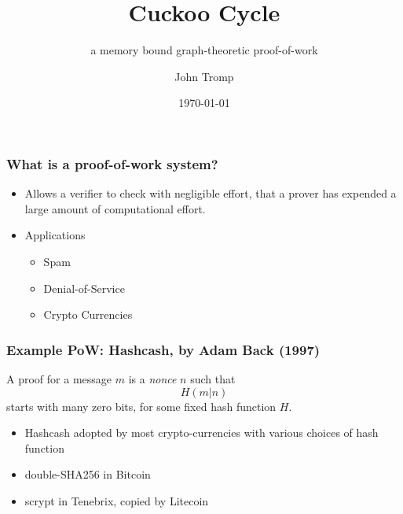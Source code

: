 \documentclass{beamer}
\title{Cuckoo Cycle}
\subtitle{a memory bound graph-theoretic proof-of-work}
\author{John Tromp}
\date{\today}
\begin{document}
\begin{frame}
  \titlepage
\end{frame}


\begin{frame}
\frametitle{What is a proof-of-work system?}
\begin{itemize}
\item
Allows a verifier to check with negligible effort, that a prover has expended a large amount of computational effort.
\item {Applications}
\begin{itemize}
\item Spam
\item Denial-of-Service
\item Crypto Currencies
\end{itemize}
\end{itemize}
\end{frame}

\begin{frame}
\frametitle{Example PoW: Hashcash, by Adam Back (1997)}
A \alert{proof} for a message $m$ is a {\em nonce} $n$ such that
\begin{equation*}
H(m|n)
\end{equation*} starts with many zero bits,
for some fixed hash function $H$.
\begin{itemize}
\item
Hashcash adopted by most crypto-currencies
with various choices of hash function
\item
double-SHA256 in Bitcoin
\item scrypt in Tenebrix, copied by Litecoin
\end{itemize}
\end{frame}
\end{document}
